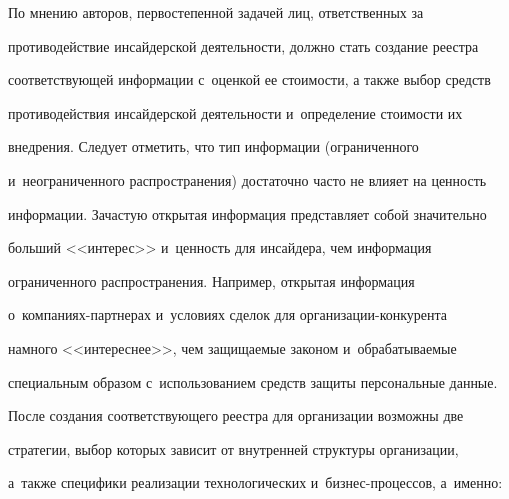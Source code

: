 \vspace*{-2pt}





     По мнению авторов, первостепенной задачей лиц, ответственных за 


противодействие инсайдерской деятельности, должно стать создание реестра 


соответствующей информации с~оценкой ее стоимости, а также выбор средств 


противодействия инсайдерской деятельности и~определение стоимости их 


внедрения. Следует отметить, что тип информации (ограниченного 


и~неограниченного распространения) достаточно часто не влияет на ценность 


информации. За\-час\-тую открытая информация представляет собой значительно 


больший <<интерес>> и~ценность для инсайдера, чем информация 


ограниченного распространения. Например, открытая информация  


о~компаниях-партнерах и~условиях сделок для организации-конкурента 


намного <<интереснее>>, чем защищаемые законом и~обрабатываемые 


специальным образом с~использованием средств защиты персональные данные.


     


     После создания соответствующего реестра для организации возможны две 


стратегии, выбор которых зависит от внутренней структуры организации, 


а~также специфики реализации технологических и~бизнес-процессов, а~именно:


